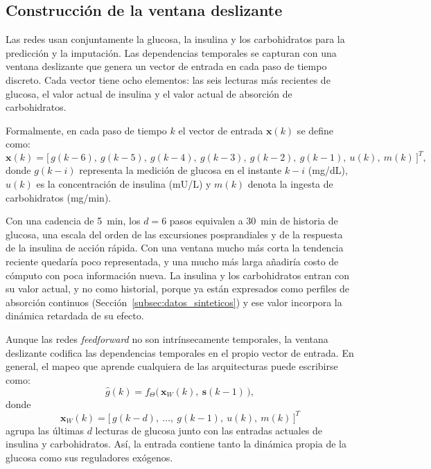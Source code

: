 \documentclass{report}
\begin{document}
\subsection{Construcción de la ventana deslizante}
\label{subsec:ventana_deslizante}

Las redes usan conjuntamente la glucosa, la insulina y los carbohidratos para la predicción y la imputación. Las dependencias temporales se capturan con una ventana deslizante que genera un vector de entrada en cada paso de tiempo discreto. Cada vector tiene ocho elementos: las seis lecturas más recientes de glucosa, el valor actual de insulina y el valor actual de absorción de carbohidratos.

Formalmente, en cada paso de tiempo $k$ el vector de entrada $\mathbf{x}(k)$ se define como:
\begin{equation}
\label{eq:ventana}
\mathbf{x}(k) = \big[\, g(k\!-\!6),\ g(k\!-\!5),\ g(k\!-\!4),\ g(k\!-\!3),\ g(k\!-\!2),\ g(k\!-\!1),\ u(k),\ m(k)\,\big]^{T},
\end{equation}
donde $g(k\!-\!i)$ representa la medición de glucosa en el instante $k\!-\!i$ (mg/dL), $u(k)$ es la concentración de insulina (mU/L) y $m(k)$ denota la ingesta de carbohidratos (mg/min).

Con una cadencia de 5~min, los $d = 6$ pasos equivalen a 30~min de historia de glucosa, una escala del orden de las excursiones posprandiales y de la respuesta de la insulina de acción rápida. Con una ventana mucho más corta la tendencia reciente quedaría poco representada, y una mucho más larga añadiría costo de cómputo con poca información nueva. La insulina y los carbohidratos entran con su valor actual, y no como historial, porque ya están expresados como perfiles de absorción continuos (Sección~\ref{subsec:datos_sinteticos}) y ese valor incorpora la dinámica retardada de su efecto.

Aunque las redes \textit{feedforward} no son intrínsecamente temporales, la ventana deslizante codifica las dependencias temporales en el propio vector de entrada. En general, el mapeo que aprende cualquiera de las arquitecturas puede escribirse como:
\begin{equation}
\label{eq:mapeo_general}
\hat{g}(k) = f_{\Theta}\big(\,\mathbf{x}_W(k),\ \mathbf{s}(k-1)\,\big),
\end{equation}
donde
\begin{equation}
\label{eq:ventana_general}
\mathbf{x}_W(k) = \big[\, g(k-d),\ \ldots,\ g(k-1),\ u(k),\ m(k)\,\big]^{T}
\end{equation}
agrupa las últimas $d$ lecturas de glucosa junto con las entradas actuales de insulina y carbohidratos. Así, la entrada contiene tanto la dinámica propia de la glucosa como sus reguladores exógenos.
\end{document}
